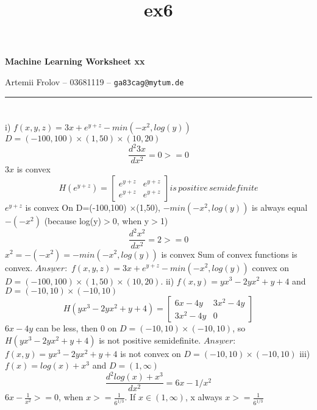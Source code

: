 \documentclass[11pt]{article}
\title{ex6}
\makeatletter
\newcommand{\exercise}{\section{}}
\newcommand{\hwhead}[4]{
\begin{center}
\sffamily\large\bfseries Machine Learning Worksheet #1
\vspace{2mm} 
\normalfont

#2 -- #3 -- \texttt{#4}
\end{center}
\vspace{6mm} \hrule \vspace{4mm}
}
\newcommand{\name}{Artemii Frolov} %
\newcommand{\imat}{03681119} %
\newcommand{\email}{ga83cag@mytum.de} %
\makeatother
\begin{document}
\hwhead{xx}{\name}{\imat}{\email}


\exercise %
i) $f(x,y,z) = 3x+e^{y+z}-min(-x^2, log(y))$ $D=(-100,100) \times(1,50) \times (10,20)$ \newline
$$\frac{d^2 3x}{dx^2} = 0 >= 0$$
$3x$ is convex\newline
\[H (e^{y+z}) =
\begin{bmatrix}
    e^{y+z}       & e^{y+z}  \\
   e^{y+z}       & e^{y+z}
\end{bmatrix} is\, positive\, semidefinite\]
$e^{y+z}$ is convex\newline
On D=(-100,100) $\times$(1,50), $-min(-x^2, log(y))$ is always equal $-(-x^2)$ (because log(y)$>$0, when y$>$1)\newline
$$\frac{d^2 x^2}{dx^2} = 2 >= 0$$
$x^2=-(-x^2)=-min(-x^2, log(y))$ is convex  \newline
Sum of convex functions is convex.\newline
$\underline{Answer:}$ $f(x,y,z) = 3x+e^{y+z}-min(-x^2, log(y))$ convex on $D=(-100,100) \times(1,50) \times (10,20)$. \newline\newline
ii) $f(x, y) = yx^3-2yx^2 + y + 4$ and $D = (-10, 10) \times(-10, 10)$
\[H (yx^3-2yx^2 + y + 4) =
\begin{bmatrix}
    6x-4y       & 3x^2-4y  \\
   3x^2-4y       & 0
\end{bmatrix}\]
$6x-4y$ can be less, then 0 on $D = (-10, 10) \times(-10, 10)$, so $H (yx^3-2yx^2 + y + 4)$ is not positive semidefinite. \newline
$\underline{Answer:}$ $f(x, y) = yx^3-2yx^2 + y + 4$ is not convex on $D = (-10, 10) \times(-10, 10)$\newline\newline
iii) $f(x) = log(x) + x^3$ and $D = (1, \infty)$
$$\frac{d^2 log(x) + x^3}{dx^2} = 6x-1/x^2 $$
$6x-\frac{1}{x^2}>=0$, when $x>=\frac{1}{6^{1/3}}$. If $x \in (1, \infty)$, x always $x>=\frac{1}{6^{1/3}}$ \newline
\end{document}

